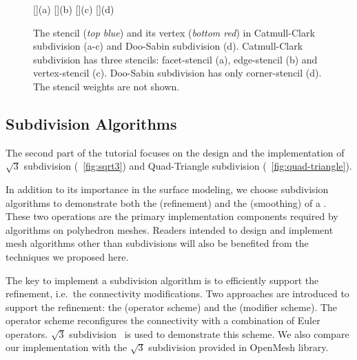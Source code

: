 \begin{figure}[h]
  \centering
  []{(a)}
  []{(b)}
  []{(c)}
  []{(d)}
  \caption{The stencil ({\itshape top blue}) and its 
           vertex ({\itshape bottom red}) in 
           Catmull-Clark subdivision (a-c)
           and Doo-Sabin subdivision (d). Catmull-Clark
           subdivision has three stencils: facet-stencil (a), 
           edge-stencil (b) and vertex-stencil (c). 
           Doo-Sabin subdivision has only corner-stencil (d).
           The stencil weights are not shown.}
  \label{fig:RefMap}
\end{figure}


\subsection*{Subdivision Algorithms}

The second part of the tutorial focuses on the design and the
implementation of $\sqrt{3}$ subdivision (\figurename\ \ref{fig:sqrt3}) 
and Quad-Triangle subdivision (\figurename\ \ref{fig:quad-triangle}).  

In addition to its importance in the surface modeling, we 
choose subdivision algorithms to demonstrate both the 
 (refinement) and the
 (smoothing) of a
\cgalpoly . These two operations are the
primary implementation components required by algorithms on
polyhedron meshes. Readers intended to design and implement
mesh algorithms other than subdivisions will also be benefited
from the techniques we proposed here.

The key to implement a subdivision algorithm is to 
efficiently support the refinement, i.e.\ the connectivity 
modifications. Two approaches are introduced to support the 
refinement: the  (operator scheme) and
the  (modifier scheme). 
The operator scheme reconfigures the connectivity with a 
combination of Euler operators. $\sqrt{3}$ subdivision~\cite{sqrt3} is
used to demonstrate this scheme. We also compare our implementation
with the $\sqrt{3}$ subdivision provided in OpenMesh library.

